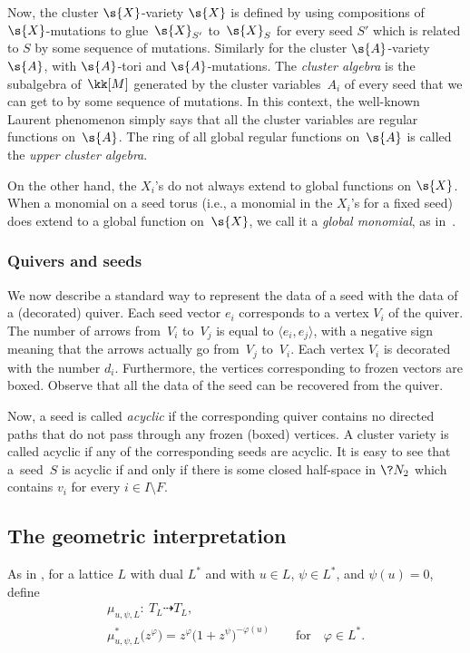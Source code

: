 Now, the cluster $\s{X}$-variety $\s{X}$ is defined by using compositions of~$\s{X}$-mutations to glue~$\s{X}_{S'}$ to~$\s{X}_S$ for every seed $S'$ which is related to $S$ by some sequence of mutations. Similarly for the cluster $\s{A}$-variety $\s{A}$, with $\s{A}$-tori and $\s{A}$-mutations. The {\it cluster algebra} is the subalgebra of~$\kk[M]$ generated by the cluster variables~$A_i$ of every seed that we can get to by some sequence of mutations. In this context, the well-known Laurent phenomenon simply says that all the cluster variables are regular functions on~$\s{A}$. The ring of all global regular functions on~$\s{A}$ is called the {\it upper cluster algebra}.

On the other hand, the $X_i$'s do not always extend to global functions on $\s{X}$. When a monomial on a seed torus (i.e., a monomial in the $X_i$'s for a fixed seed) does extend to a global function on~$\s{X}$, we call it a {\it global monomial}, as in~\cite{GHK3}.

\subsubsection{Quivers and seeds}\label{quivers}

We now describe a standard way to represent the data of a seed with the data of a (decorated) quiver. Each seed vector $e_i$ corresponds to a vertex $V_i$ of the quiver. The number of arrows from~$V_i$ to~$V_j$ is equal to $\langle e_i , e_j\rangle$, with a negative sign meaning that the arrows actually go from~$V_j$ to~$V_i$. Each vertex $V_i$ is decorated with the number $d_i$. Furthermore, the vertices corresponding to frozen vectors are boxed. Observe that all the data of the seed can be recovered from the quiver.

Now, a seed is called {\it acyclic} if the corresponding quiver contains no directed paths that do not pass through any frozen (boxed) vertices. A cluster variety is called acyclic if any of the corresponding seeds are acyclic. It is easy to see that a~seed~$S$ is acyclic if and only if there is some closed half-space in $\?{N_2}$ which contains $v_i$ for every $i\in I\setminus F$.

\subsection{The geometric interpretation}\label{geom int}

As in \cite{GHK3}, for a lattice $L$ with dual $L^*$ and with $u \in L$, $\psi \in L^*$, and $\psi(u)=0$, define
\begin{gather*}
	\mu_{u,\psi,L}\colon \ T_L \dashrightarrow T_L, \\
	\mu_{u,\psi,L}^*\big(z^{\varphi}\big) = z^\varphi\big(1+z^{\psi}\big)^{-\varphi(u)} \qquad \text{for} \quad \varphi\in L^*.
\end{gather*}

